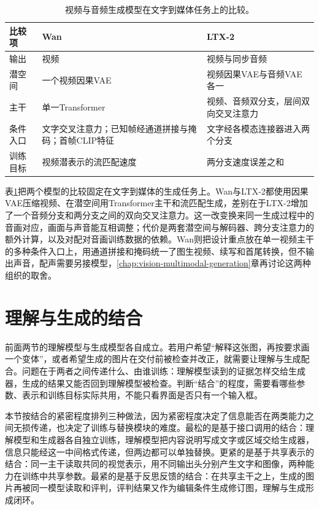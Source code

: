 \begin{table}[htbp]
  \centering
  \small
  \begin{tabularx}{\linewidth}{@{}p{18mm}XX@{}}
    \toprule
    比较项 & Wan & LTX-2\\
    \midrule
    输出 & 视频 & 视频与同步音频\\
    潜空间 & 一个视频因果VAE & 视频因果VAE与音频VAE各一\\
    主干 & 单一Transformer & 视频、音频双分支，层间双向交叉注意力\\
    条件入口 & 文字交叉注意力；已知帧经通道拼接与掩码；首帧CLIP特征 & 文字经各模态连接器进入两个分支\\
    训练目标 & 视频潜表示的流匹配速度 & 两分支速度误差之和\\
    \bottomrule
  \end{tabularx}
  \caption{视频与音频生成模型在文字到媒体任务上的比较。}
  \label{tab:vision-models-video-audio-compare}
\end{table}

表\ref{tab:vision-models-video-audio-compare}把两个模型的比较固定在文字到媒体的生成任务上。Wan与LTX-2都使用因果VAE压缩视频、在潜空间用Transformer主干和流匹配生成，差别在于LTX-2增加了一个音频分支和两分支之间的双向交叉注意力。这一改变换来同一生成过程中的音画对应，画面与声音能互相调整；代价是两套潜空间与解码器、跨分支注意力的额外计算，以及对配对音画训练数据的依赖。Wan则把设计重点放在单一视频主干的多种条件入口上，用通道拼接和掩码统一了图生视频、续写和首尾转换，但不输出声音，配声需要另接模型，\ref{chap:vision-multimodal-generation}章再讨论这两种组织的取舍。

\section{理解与生成的结合}
\label{sec:vision-models-unified}

前面两节的理解模型与生成模型各自成立。若用户希望“解释这张图，再按要求画一个变体”，或者希望生成的图片在交付前被检查并改正，就需要让理解与生成配合。问题在于两者之间传递什么、由谁训练：理解模型读到的证据怎样交给生成器，生成的结果又能否回到理解模型被检查。判断“结合”的程度，需要看哪些参数、表示和训练目标实际共用，不能只看界面是否只有一个输入框。

本节按结合的紧密程度排列三种做法，因为紧密程度决定了信息能否在两类能力之间无损传递，也决定了训练与替换模块的难度。最松的是基于接口调用的结合：理解模型和生成器各自独立训练，理解模型把内容说明写成文字或区域交给生成器，信息只能经这一中间格式传递，但两边都可以单独替换。更紧的是基于共享表示的结合：同一主干读取共同的视觉表示，用不同输出头分别产生文字和图像，两种能力在训练中共享参数。最紧的是基于反思反馈的结合：在共享主干之上，生成的图片再被同一模型读取和评判，评判结果又作为编辑条件生成修订图，理解与生成形成闭环。

